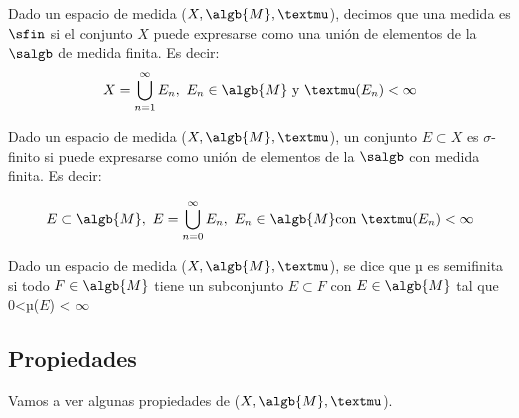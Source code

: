 \documentclass{apuntes}
\begin{document}
\begin{example}
\begin{defn}
Dado un espacio de medida ($X, \algb{M}, µ$), decimos que una medida es $\sfin$ si el conjunto $X$ puede expresarse como una unión de elementos de la $\salgb$ de medida finita. Es decir: \[X=\bigcup_{n=1}^{\infty}E_n, \ E_n \in \algb{M} \text{ y }µ(E_n)< \infty\]
\end{defn}

\begin{defn}
Dado un espacio de medida ($X, \algb{M}, µ$), un conjunto $E \subset X$ es $\sigma$-finito si puede expresarse como unión de elementos de la $\salgb$ con medida finita. Es decir:

\[E\subset \algb{M}, \ E=\bigcup_{n=0}^{\infty} E_n, \ E_n \in \algb{M} \text{con} \ µ(E_n)< \infty\]
\end{defn}

\begin{defn}
Dado un espacio de medida ($X, \algb{M}, µ$), se dice que µ es semifinita si todo $F\in \algb{M}$ tiene un subconjunto $E\subset F$ con $E\in \algb{M}$ tal que 0<µ($E$) < $\infty$

\end{defn}
\end{example}

\subsection{Propiedades}
Vamos a ver algunas propiedades de ($X, \algb{M}, µ$).
\end{document}
